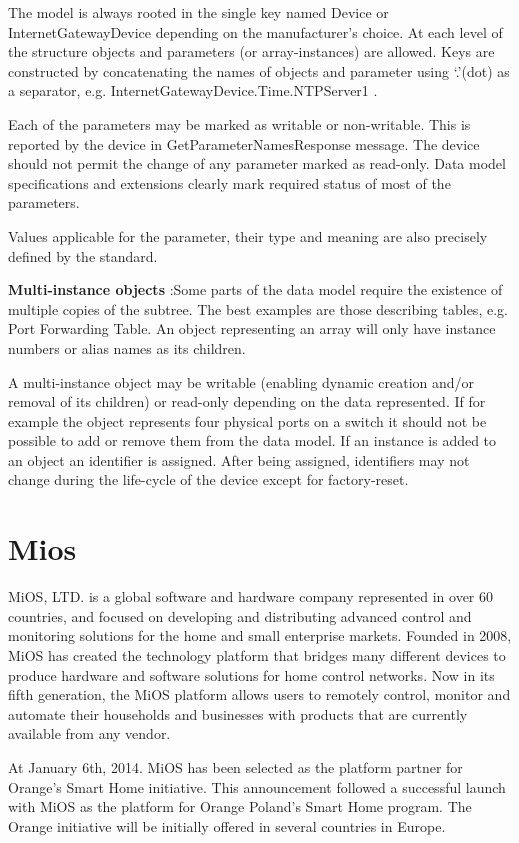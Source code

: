 The model is always rooted in the single key named Device or InternetGatewayDevice depending on the manufacturer's choice. At each level of the structure objects and parameters (or array-instances) are allowed. Keys are constructed by concatenating the names of objects and parameter using `.'(dot) as a separator, e.g. InternetGatewayDevice.Time.NTPServer1 .

Each of the parameters may be marked as writable or non-writable. This is reported by the device in GetParameterNamesResponse message. The device should not permit the change of any parameter marked as read-only. Data model specifications and extensions clearly mark required status of most of the parameters.

Values applicable for the parameter, their type and meaning are also precisely defined by the standard.

\textbf{Multi-instance objects} :Some parts of the data model require the existence of multiple copies of the subtree. The best examples are those describing tables, e.g. Port Forwarding Table. An object representing an array will only have instance numbers or alias names as its children.

A multi-instance object may be writable (enabling dynamic creation and/or removal of its children) or read-only depending on the data represented. If for example the object represents four physical ports on a switch it should not be possible to add or remove them from the data model. If an instance is added to an object an identifier is assigned. After being assigned, identifiers may not change during the life-cycle of the device except for factory-reset.
\section{Mios}
MiOS, LTD. is a global software and hardware company represented in over 60 countries, and focused on developing and distributing advanced control and monitoring solutions for the home and small enterprise markets. Founded in 2008, MiOS has created the technology platform that bridges many different devices to produce hardware and software solutions for home control networks. Now in its fifth generation, the MiOS platform allows users to remotely control, monitor and automate their households and businesses with products that are currently available from any vendor.

At January 6th, 2014. MiOS has been selected as the platform partner for Orange’s Smart Home initiative. This announcement followed a successful launch with MiOS as the platform for Orange Poland’s Smart Home program.  The Orange initiative will be initially offered in several countries in Europe.

